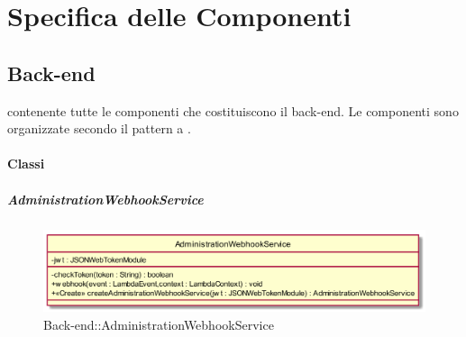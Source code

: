 \section{Specifica delle Componenti}
\subsection{Back-end}
 contenente tutte le componenti che costituiscono il back-end. Le componenti sono organizzate secondo il pattern a .
\paragraph{Classi}
\hypertarget{AdministrationWebhookService_label}{\subparagraph{AdministrationWebhookService}}
\begin{figure}[h]
	\centering
	\includegraphics[width=\textwidth,height=\textheight,keepaspectratio]{images/ClassAdministrationWebhookService.png}
	\caption{Back-end::AdministrationWebhookService}
\end{figure}
